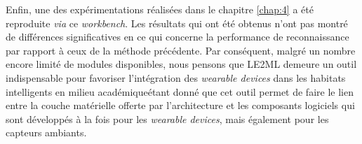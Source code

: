 Enfin, une des expérimentations réalisées dans le chapitre \ref{chap:4} a été reproduite \textit{via} ce \textit{workbench}. Les résultats qui ont été obtenus n'ont pas montré de différences significatives en ce qui concerne la performance de reconnaissance par rapport à ceux de la méthode précédente. Par conséquent, malgré un nombre encore limité de modules disponibles, nous pensons que \acs{LE2ML} demeure un outil indispensable pour favoriser l'intégration des \textit{wearable devices} dans les habitats intelligents en milieu académique\textemdash étant donné que cet outil permet de faire le lien entre la couche matérielle offerte par l'architecture et les composants logiciels qui sont développés à la fois pour les \textit{wearable devices}, mais également pour les capteurs ambiants.
